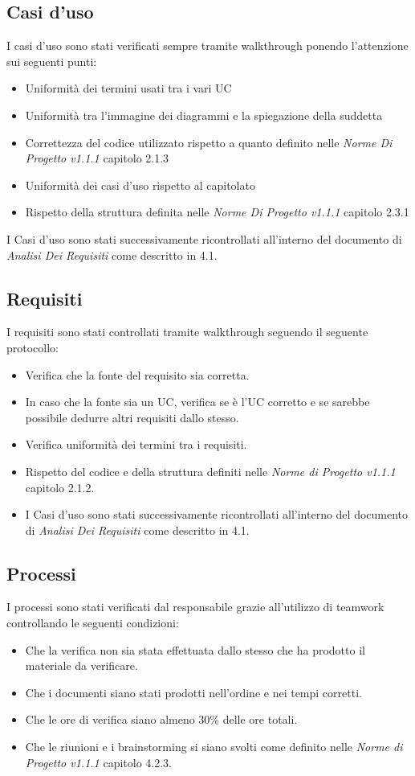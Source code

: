 \documentclass[a4paper]{report}
\begin{document}
			\subsection{Casi d'uso}
				I casi d'uso sono stati verificati sempre tramite walkthrough ponendo l'attenzione sui seguenti punti:
				\begin{itemize}
					\item Uniformità dei termini usati tra i vari UC
					\item Uniformità tra l'immagine dei diagrammi e la spiegazione della suddetta
					\item Correttezza del codice utilizzato rispetto a quanto definito nelle \emph{Norme Di Progetto v1.1.1} capitolo
					2.1.3
					\item Uniformità dei casi d'uso rispetto al capitolato
					\item Rispetto della struttura definita nelle \emph{Norme Di Progetto v1.1.1} capitolo 2.3.1
				\end{itemize}

				I Casi d'uso sono stati successivamente ricontrollati all'interno del documento di \emph{Analisi Dei Requisiti} come
				descritto in 4.1.
			\subsection{Requisiti}
				I requisiti sono stati controllati tramite walkthrough seguendo il seguente protocollo:
					\begin{itemize}
						\item Verifica che la fonte del requisito sia corretta.
						\item In caso che la fonte sia un UC, verifica se è l'UC corretto e se sarebbe possibile dedurre altri requisiti dallo stesso.
						\item Verifica uniformità dei termini tra i requisiti.
						\item Rispetto del codice e della struttura definiti nelle \emph{Norme di Progetto v1.1.1} capitolo 2.1.2.
						\item I Casi d'uso sono stati successivamente ricontrollati all'interno del documento di \emph{Analisi Dei Requisiti} 
						come descritto in 4.1.
					\end{itemize}
			\subsection{Processi}
				I processi sono stati verificati dal responsabile grazie all'utilizzo di teamwork controllando le seguenti condizioni:
				\begin{itemize}
					\item Che la verifica non sia stata effettuata dallo stesso che ha prodotto il materiale da verificare.
					\item Che i documenti siano stati prodotti nell'ordine e nei tempi corretti.
					\item Che le ore di verifica siano almeno 30\% delle ore totali.
					\item Che le riunioni e i brainstorming si siano svolti come definito nelle \emph{Norme di Progetto v1.1.1} capitolo 4.2.3.
				\end{itemize}
				
\end{document}
